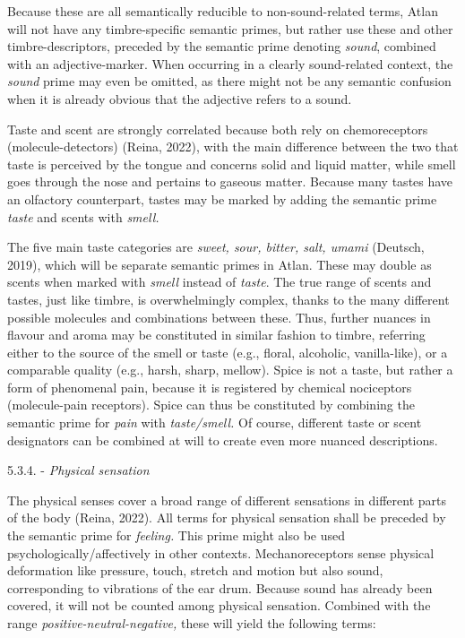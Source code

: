 Because these are all semantically reducible to non-sound-related terms, Atlan will not have any timbre-specific semantic primes, but rather use these and other timbre-descriptors, preceded by the semantic prime denoting \textit{sound}, combined with an adjective-marker. When occurring in a clearly sound-related context, the \textit{sound} prime may even be omitted, as there might not be any semantic confusion when it is already obvious that the adjective refers to a sound. 



\noindent Taste and scent are strongly correlated because both rely on chemoreceptors (molecule-detectors) (Reina, 2022), with the main difference between the two that taste is perceived by the tongue and concerns solid and liquid matter, while smell goes through the nose and pertains to gaseous matter. Because many tastes have an olfactory counterpart, tastes may be marked by adding the semantic prime \textit{taste} and scents with \textit{smell.} 

The five main taste categories are \textit{sweet, sour, bitter, salt, umami}  (Deutsch, 2019), which will be separate semantic primes in Atlan. These may double as scents when marked with \textit{smell} instead of \textit{taste}. The true range of scents and tastes, just like timbre, is overwhelmingly complex, thanks to the many different possible molecules and combinations between these. Thus, further nuances in flavour and aroma may be constituted in similar fashion to timbre, referring either to the source of the smell or taste (e.g., floral, alcoholic, vanilla-like), or a comparable quality (e.g., harsh, sharp, mellow). Spice is not a taste, but rather a form of phenomenal pain, because it is registered by chemical nociceptors (molecule-pain receptors). Spice can thus be constituted by combining the semantic prime for \textit{pain} with \textit{taste/smell.} Of course, different taste or scent designators can be combined at will to create even more nuanced descriptions. 


{5.3.4. - \it Physical sensation}

The physical senses cover a broad range of different sensations in different parts of the body (Reina, 2022). All terms for physical sensation shall be preceded by the semantic prime for \textit{feeling.} This prime might also be used psychologically/affectively in other contexts. Mechanoreceptors sense physical deformation like pressure, touch, stretch and motion but also sound, corresponding to vibrations of the ear drum. Because sound has already been covered, it will not be counted among physical sensation. Combined with the range \textit{positive-neutral-negative,} these will yield the following terms:  

